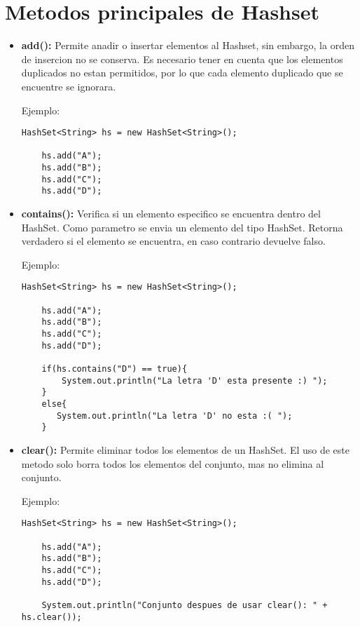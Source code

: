\documentclass[12pt, letterpaper]{article} %
\begin{document}
\section*{Metodos principales de Hashset}
\begin{itemize}
    \item \textbf{add():} Permite anadir o insertar elementos al Hashset, sin embargo, la orden de insercion no se conserva. Es necesario tener en cuenta que los elementos duplicados no estan permitidos, por lo que cada elemento duplicado que se encuentre se ignorara. 

    Ejemplo:
    \lstset{language = Java, breaklines=true, basicstyle=\footnotesize}
    \begin{lstlisting}[frame=single]
    HashSet<String> hs = new HashSet<String>();

    hs.add("A");
    hs.add("B");
    hs.add("C");
    hs.add("D");
    \end{lstlisting}

    \item \textbf{contains():} Verifica si un elemento especifico se encuentra dentro del HashSet. Como parametro se envia un elemento del tipo HashSet. Retorna  verdadero si el elemento se encuentra, en caso contrario devuelve falso.

    Ejemplo:
    \lstset{language = Java, breaklines=true, basicstyle=\footnotesize}
    \begin{lstlisting}[frame=single]
    HashSet<String> hs = new HashSet<String>();

    hs.add("A");
    hs.add("B");
    hs.add("C");
    hs.add("D");

    if(hs.contains("D") == true){
        System.out.println("La letra 'D' esta presente :) ");
    }
    else{
	   System.out.println("La letra 'D' no esta :( ");
    }
    \end{lstlisting}

    \item \textbf{clear():} Permite eliminar todos los elementos de un HashSet. El uso de este metodo solo borra todos los elementos del conjunto, mas no elimina al conjunto.

    Ejemplo:
    \lstset{language = Java, breaklines=true, basicstyle=\footnotesize}
    \begin{lstlisting}[frame=single]
    HashSet<String> hs = new HashSet<String>();

    hs.add("A");
    hs.add("B");
    hs.add("C");
    hs.add("D");

    System.out.println("Conjunto despues de usar clear(): " + hs.clear());
    \end{lstlisting}


\end{itemize}
\end{document}
